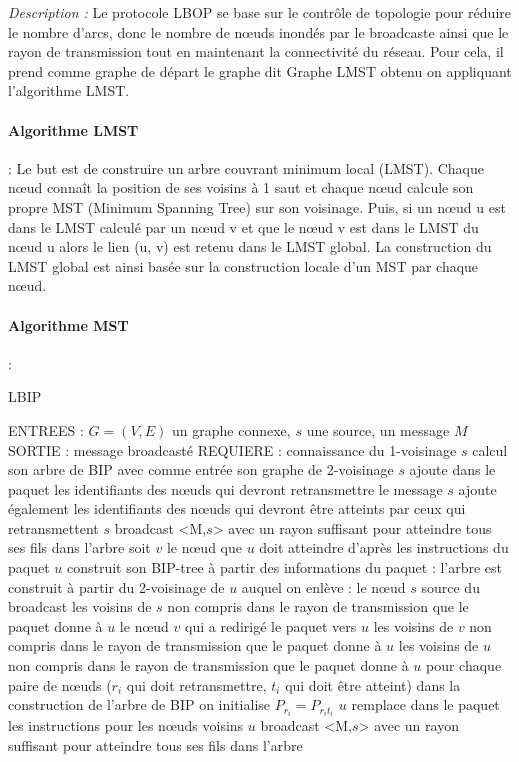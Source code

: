 \emph{Description :} Le protocole LBOP se base sur le contrôle de topologie pour réduire le nombre d'arcs, donc le nombre de nœuds inondés par le broadcaste ainsi que le rayon de transmission tout en maintenant la connectivité du réseau. Pour cela, il prend comme graphe de départ le graphe dit Graphe LMST obtenu on appliquant l’algorithme LMST.

\paragraph{Algorithme LMST}:
Le but est de construire un arbre couvrant minimum local (LMST). Chaque nœud connaît la position de ses voisins à 1 saut et chaque nœud calcule son propre MST (Minimum Spanning Tree) sur son voisinage. Puis, si un nœud u est dans le LMST calculé par un nœud v et que le nœud v est dans le LMST du nœud u alors le lien (u, v) est retenu dans le LMST global. La construction du LMST global est ainsi basée sur la construction locale d’un MST par chaque nœud.
\paragraph{Algorithme MST}:

\begin{algorithm}[H]
\caption{LBIP}
\label{algo_LBIP}
\begin{algorithmic}
\STATE ENTREES : $G=(V,E)$ un graphe connexe, $s$ une source, un message $M$
\STATE SORTIE : message broadcasté
\STATE REQUIERE : connaissance du 1-voisinage
\STATE $s$ calcul son arbre de BIP avec comme entrée son graphe de 2-voisinage
\STATE $s$ ajoute dans le paquet les identifiants des nœuds qui devront retransmettre le message
\STATE $s$ ajoute également les identifiants des nœuds qui devront être atteints par ceux qui retransmettent
\STATE $s$ broadcast <M,$s$> avec un rayon suffisant pour atteindre tous ses fils dans l'arbre
		\STATE soit $v$ le nœud que $u$ doit atteindre d'après les instructions du paquet
		\STATE $u$ construit son BIP-tree à partir des informations du paquet :
			 \INDSTATE l'arbre est construit à partir du 2-voisinage de $u$ auquel on enlève :
			 	 \INDSTATE[2]le nœud $s$ source du broadcast
				 \INDSTATE[2]les voisins de $s$ non compris dans le rayon de transmission que le paquet donne à $u$
				 \INDSTATE[2]le nœud $v$ qui a redirigé le paquet vers $u$
				 \INDSTATE[2]les voisins de $v$ non compris dans le rayon de transmission que le paquet donne à $u$
				\INDSTATE[2]les voisins de $u$ non compris dans le rayon de transmission que le paquet donne à $u$
			\INDSTATE[1] pour chaque paire de nœuds ($r_i$ qui doit retransmettre, $t_i$ qui doit être atteint)
				\INDSTATE[2] dans la construction de l'arbre de BIP on initialise $P_{r_i} = P_{r_i t_i}$
			\INDSTATE[1] $u$ remplace dans le paquet les instructions pour les nœuds voisins
			\INDSTATE[1] $u$ broadcast <M,$s$> avec un rayon suffisant pour atteindre tous ses fils dans l'arbre
	\ENDIF
\ENDIF
\end{algorithmic}
\end{algorithm}

